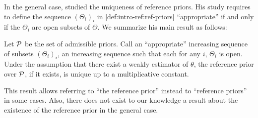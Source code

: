 








In the general case, \citet{mure_objective_2018} studied the uniqueness of reference priors. 
His study requires to define the sequence $(\Theta_i)_i$ in \cref{def:intro-ref:ref-priors} ``appropriate'' if and only if the $\Theta_i$ are open subsets of $\Theta$.
%
We summarize his main result as follows:
\begin{thm}
    Let $\mathcal{P}$ be the set of admissible priors. 
    Call an ``appropriate'' increasing sequence of subsets $(\Theta_i)_i$, an increasing sequence such that each for any $i$, $\Theta_i$ is open.
    Under the assumption that there exist a weakly estimator of $\theta$, the reference prior over $\mathcal{P}$, if it exists, is unique up to a multiplicative constant.
\end{thm}

This result allows referring to ``the reference prior'' instead to ``reference priors'' in some cases. %
Also, there does not exist to our knowledge a result about the existence of the reference prior in the general case.

